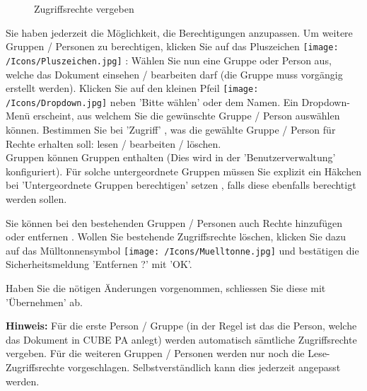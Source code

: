 \begin{figure}[H]
\caption{Zugriffsrechte vergeben}
\end{figure}

Sie haben jederzeit die Möglichkeit, die Berechtigungen anzupassen. Um weitere Gruppen / Personen zu berechtigen, klicken Sie auf das Pluszeichen \texttt{[image: /Icons/Pluszeichen.jpg]} : Wählen Sie nun eine Gruppe oder Person aus, welche das Dokument einsehen / bearbeiten darf (die Gruppe muss vorgängig erstellt werden). Klicken Sie auf den kleinen Pfeil \texttt{[image: /Icons/Dropdown.jpg]} neben 'Bitte wählen' oder dem Namen. Ein Dropdown-Menü erscheint, aus welchem Sie die gewünschte Gruppe / Person auswählen können. Bestimmen Sie bei 'Zugriff' , was die gewählte Gruppe / Person für Rechte erhalten soll: lesen / bearbeiten / löschen.\\
Gruppen können Gruppen enthalten (Dies wird in der 'Benutzerverwaltung' konfiguriert). Für solche untergeordnete Gruppen müssen Sie explizit ein Häkchen bei 'Untergeordnete Gruppen berechtigen' setzen , falls diese ebenfalls berechtigt werden sollen.

\vspace{\baselineskip}

Sie können bei den bestehenden Gruppen / Personen auch Rechte hinzufügen oder entfernen . Wollen Sie bestehende Zugriffsrechte löschen, klicken Sie dazu auf das Mülltonnensymbol \texttt{[image: /Icons/Muelltonne.jpg]}  und bestätigen die Sicherheitsmeldung 'Entfernen ?' mit 'OK'.  \newline

Haben Sie die nötigen Änderungen vorgenommen, schliessen Sie diese mit 'Übernehmen' ab. 

\vspace{\baselineskip}

\textbf{Hinweis:} Für die erste Person / Gruppe (in der Regel ist das die Person, welche das Dokument in CUBE PA anlegt) werden automatisch sämtliche Zugriffsrechte vergeben. Für die weiteren Gruppen / Personen werden nur noch die Lese-Zugriffsrechte vorgeschlagen. Selbstverständlich kann dies jederzeit angepasst werden.



